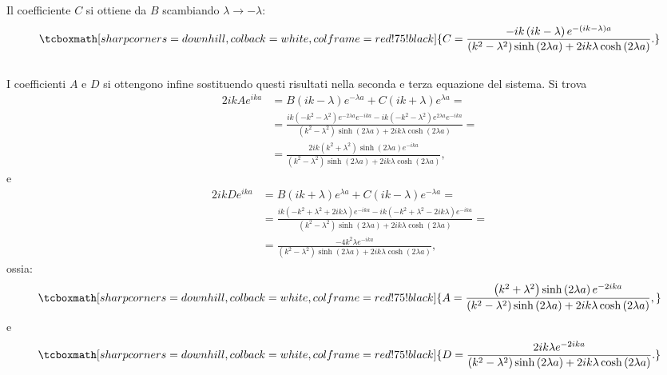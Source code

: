 Il coefficiente $C$ si ottiene da $B$ scambiando $\lambda \rightarrow -\lambda$:
	\begin{equation}
		\tcboxmath[sharp corners=downhill, colback=white, colframe=red!75!black]{
			C=\frac{-ik\left(ik-\lambda \right)e^{-\left(ik-\lambda\right) a }}{\left(k^2-\lambda^2\right)\sinh \left(2\lambda a\right)+2ik\lambda \cosh\left(2\lambda a\right)}.
			}
	\end{equation}\\
	
I coefficienti $A$ e $D$ si ottengono infine sostituendo questi risultati nella seconda e terza equazione del sistema. Si trova
	\begin{align}
 2ikAe^{ika} &= B \left(ik-\lambda\right)e^{-\lambda a} +C \left(ik+\lambda\right)e^{\lambda a}=\nonumber \\[0.3cm]
	& = \displaystyle{\frac{ik\left(-k^2-\lambda ^2 \right)e^{-2\lambda a }e^{-ika }-ik\left(-k^2-\lambda ^2 \right)e^{2\lambda a }e^{-ika }}{\left(k^2-\lambda^2\right)\sinh \left(2\lambda a\right)+2ik\lambda \cosh\left(2\lambda a\right)}=} \nonumber \\[0.3cm]
	&\displaystyle{ =\frac{2ik\left(k^2+\lambda ^2 \right)\sinh\left(2\lambda a\right)e^{-ika}}{\left(k^2-\lambda^2\right)\sinh \left(2\lambda a\right)+2ik\lambda \cosh\left(2\lambda a\right)}},
	\end{align}
e
	\begin{align}
		2ikD e^{ika} &= B\left(ik+\lambda\right)e^{\lambda a} + C\left(ik-\lambda\right)e^{-\lambda a} = \nonumber \\[0.3cm]
		& = \displaystyle{\frac{ik\left(-k^2 + \lambda ^2 +2ik\lambda\right)e^{-ika}-ik\left(-k^2 + \lambda ^2 -2ik\lambda\right)e^{-ika}}{\left(k^2-\lambda^2\right)\sinh \left(2\lambda a\right)+2ik\lambda \cosh\left(2\lambda a\right)}=} \nonumber \\[0.3cm]
	&\displaystyle{ =\frac{-4k^2\lambda e^{-ika}}{\left(k^2-\lambda^2\right)\sinh \left(2\lambda a\right)+2ik\lambda \cosh\left(2\lambda a\right)}},
	\end{align}
ossia:
	\begin{equation}
		\tcboxmath[sharp corners=downhill, colback=white, colframe=red!75!black]{
			A=\frac{\left(k^2+\lambda ^2\right)\sinh\left(2\lambda a \right)e^{-2ika}}{\left(k^2-\lambda^2\right)\sinh \left(2\lambda a\right)+2ik\lambda \cosh\left(2\lambda a\right)},
			}
	\end{equation}
e
	\begin{equation}
		\tcboxmath[sharp corners=downhill, colback=white, colframe=red!75!black]{
			D=\frac{2ik\lambda e^{-2ika}}{\left(k^2-\lambda^2\right)\sinh \left(2\lambda a\right)+2ik\lambda \cosh\left(2\lambda a\right)}.
			}
	\end{equation}\\
	
